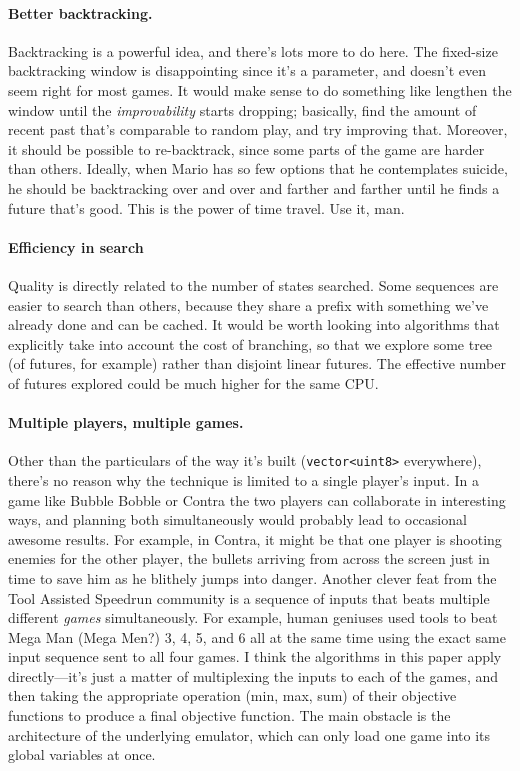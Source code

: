 \documentclass[twocolumn]{article}
\begin{document}
\paragraph{Better backtracking.}
Backtracking is a powerful idea, and there's lots more to do here. The
fixed-size backtracking window is disappointing since it's a
parameter, and doesn't even seem right for most games. It would make
sense to do something like lengthen the window until the {\em
  improvability} starts dropping; basically, find the amount of recent
past that's comparable to random play, and try improving that.
Moreover, it should be possible to re-backtrack, since some parts of
the game are harder than others. Ideally, when Mario has so few
options that he contemplates suicide, he should be backtracking over
and over and farther and farther until he finds a future that's good.
This is the power of time travel. Use it, man.

\paragraph{Efficiency in search}
Quality is directly related to the number of states searched. Some
sequences are easier to search than others, because they share a prefix
with something we've already done and can be cached. It would be worth
looking into algorithms that explicitly take into account the cost of
branching, so that we explore some tree (of futures, for example) rather
than disjoint linear futures. The effective number of futures explored
could be much higher for the same CPU.

\paragraph{Multiple players, multiple games.}
Other than the particulars of the way it's built (\verb+vector<uint8>+
everywhere), there's no reason why the technique is limited to a
single player's input. In a game like Bubble Bobble or Contra the two
players can collaborate in interesting ways, and planning both
simultaneously would probably lead to occasional awesome results. For
example, in Contra, it might be that one player is shooting enemies
for the other player, the bullets arriving from across the screen just
in time to save him as he blithely jumps into danger. Another clever
feat from the Tool Assisted Speedrun community is a sequence of inputs
that beats multiple different {\em games} simultaneously. For example,
human geniuses used tools to beat Mega Man (Mega Men?) 3, 4, 5, and 6
all at the same time using the exact same input sequence sent to all
four games.\cite{BaxterTAS} I think the algorithms in this paper apply
directly---it's just a matter of multiplexing the inputs to each of
the games, and then taking the appropriate operation (min, max, sum)
of their objective functions to produce a final objective function.
The main obstacle is the architecture of the underlying emulator,
which can only load one game into its global variables at once.
\end{document}
